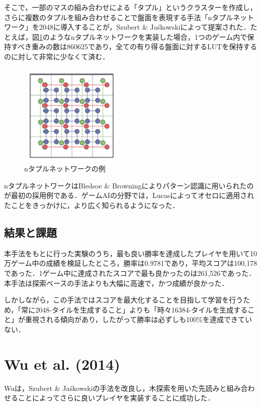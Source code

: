 \documentclass{suribt}
\begin{document}
そこで，一部のマスの組み合わせによる「タプル」というクラスターを作成し，さらに複数のタプルを組み合わせることで盤面を表現する手法「nタプルネットワーク」を2048に導入することが，Szubert \& Ja\'{s}kowskiによって提案された．たとえば，図\ref{figure_001}のようなnタプルネットワークを実装した場合，1つのゲーム内で保持すべき重みの数は860625であり，全ての有り得る盤面に対するLUTを保持するのに対して非常に少なくて済む．

\begin{figure}[t]
	\begin{center}
	\includegraphics[width=5cm]{figure_001.png}
	\caption{nタプルネットワークの例}
	\label{figure_001}
	\end{center}
\end{figure}

nタプルネットワークはBledsoe \& Browningによりパターン認識に用いられたのが最初の採用例である\cite{Bledsoe}．ゲームAIの分野では，Lucasによってオセロに適用されたことをきっかけに，より広く知られるようになった\cite{Lucas}．

\subsection{結果と課題}
本手法をもとに行った実験のうち，最も良い勝率を達成したプレイヤを用いて10万ゲーム中の成績を検証したところ，勝率は0.9781であり，平均スコアは100,178であった．1ゲーム中に達成されたスコアで最も良かったのは261,526であった．本手法は探索ベースの手法よりも大幅に高速で，かつ成績が良かった\cite{Szubert}．

しかしながら，この手法ではスコアを最大化することを目指して学習を行うため，「常に2048-タイルを生成すること」よりも「時々16384-タイルを生成すること」が重視される傾向があり，したがって勝率は必ずしも100\%を達成できていない．

\section{Wu et al. (2014)}
Wuは，Szubert \& Ja\'{s}kowskiの手法を改良し，木探索を用いた先読みと組み合わせることによってさらに良いプレイヤを実装することに成功した．
\end{document}
